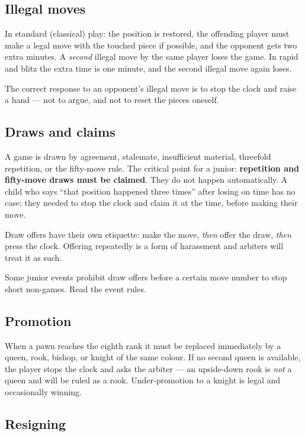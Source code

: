 \documentclass[10pt,letterpaper]{article}
\begin{document}
\subsection{Illegal moves}

In standard (classical) play: the position is restored, the offending player
must make a legal move with the touched piece if possible, and the opponent
gets two extra minutes. A \emph{second} illegal move by the same player loses
the game. In rapid and blitz the extra time is one minute, and the second
illegal move again loses.

The correct response to an opponent's illegal move is to stop the clock and
raise a hand --- not to argue, and not to reset the pieces oneself.

\subsection{Draws and claims}

A game is drawn by agreement, stalemate, insufficient material, threefold
repetition, or the fifty-move rule. The critical point for a junior:
\textbf{repetition and fifty-move draws must be claimed}. They do not happen
automatically. A child who says ``that position happened three times'' after
losing on time has no case; they needed to stop the clock and claim it at the
time, before making their move.

Draw offers have their own etiquette: make the move, \emph{then} offer the draw,
\emph{then} press the clock. Offering repeatedly is a form of harassment and
arbiters will treat it as such.

Some junior events prohibit draw offers before a certain move number to stop
short non-games. Read the event rules.

\subsection{Promotion}

When a pawn reaches the eighth rank it must be replaced immediately by a queen,
rook, bishop, or knight of the same colour. If no second queen is available, the
player stops the clock and asks the arbiter --- an upside-down rook is
\emph{not} a queen and will be ruled as a rook. Under-promotion to a knight is
legal and occasionally winning.

\subsection{Resigning}
\end{document}
